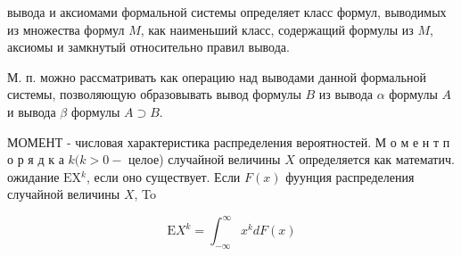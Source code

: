 \documentclass[10pt]{article}
\begin{document}
вывода и аксиомами формальной системы определяет класс формул, выводимых из множества формул $M$, как наименьший класс, содержащий формулы из $M$, аксиомы и замкнутый относительно правил вывода.



М. п. можно рассматривать как операцию над выводами данной формальной системы, позволяющую образовывать вывод формулы $B$ из вывода $\alpha$ формулы $A$ и вывода $\beta$ формулы $A \supset B$.



МОМЕНТ - числовая характеристика распределения вероятностей. М о м е н т п о р я д к а $k(k>0-$ целое) случайной величины $X$ определяется как математич. ожидание $\mathrm{EX}{ }^{k}$, если оно существует. Если $F(x)$ фуунция распределения случайной величины $X$, To



\[

\mathrm{E} X^{k}=\int_{-\infty}^{\infty} x^{k} d F(x)

\]
\end{document}
